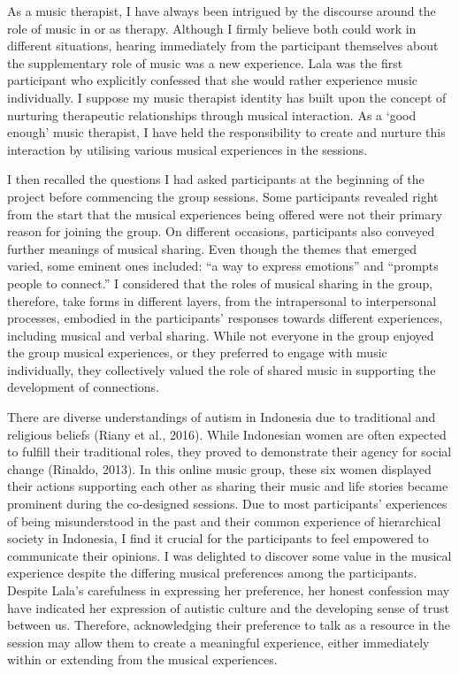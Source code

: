 \documentclass[authordate, empirical, issue]{jote-new-article}
\begin{document}
As a music therapist, I have always been intrigued by the discourse around the role of music in or as therapy. Although I firmly believe both could work in different situations, hearing immediately from the participant themselves about the supplementary role of music was a new experience. Lala was the first participant who explicitly confessed that she would rather experience music individually. I suppose my music therapist identity has built upon the concept of nurturing therapeutic relationships through musical interaction. As a ‘good enough' music therapist, I have held the responsibility to create and nurture this interaction by utilising various musical experiences in the sessions.



I then recalled the questions I had asked participants at the beginning of the project before commencing the group sessions. Some participants revealed right from the start that the musical experiences being offered were not their primary reason for joining the group. On different occasions, participants also conveyed further meanings of musical sharing. Even though the themes that emerged varied, some eminent ones included: “a way to express emotions” and “prompts people to connect.” I considered that the roles of musical sharing in the group, therefore, take forms in different layers, from the intrapersonal to interpersonal processes, embodied in the participants' responses towards different experiences, including musical and verbal sharing. While not everyone in the group enjoyed the group musical experiences, or they preferred to engage with music individually, they collectively valued the role of shared music in supporting the development of connections.



There are diverse understandings of autism in Indonesia due to traditional and religious beliefs (Riany et al., 2016). While Indonesian women are often expected to fulfill their traditional roles, they proved to demonstrate their agency for social change (Rinaldo, 2013). In this online music group, these six women displayed their actions supporting each other as sharing their music and life stories became prominent during the co-designed sessions. Due to most participants' experiences of being misunderstood in the past and their common experience of hierarchical society in Indonesia, I find it crucial for the participants to feel empowered to communicate their opinions. I was delighted to discover some value in the musical experience despite the differing musical preferences among the participants. Despite Lala's carefulness in expressing her preference, her honest confession may have indicated her expression of autistic culture and the developing sense of trust between us. Therefore, acknowledging their preference to talk as a resource in the session may allow them to create a meaningful experience, either immediately within or extending from the musical experiences.
\end{document}

